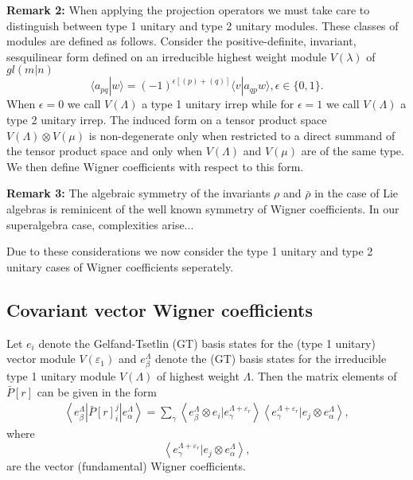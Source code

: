 \documentclass[12pt]{article}
\begin{document}
{\bf Remark 2:} 
When applying the projection operators we must take care to distinguish between type 1 unitary and type 2 unitary modules. These classes of modules are defined as follows. Consider the positive-definite, invariant, sesquilinear form defined on an irreducible highest weight module $V(\lambda)$ of $gl(m|n)$ 
$$
\langle a_{pq} | w \rangle = (-1)^{\epsilon [(p) + (q)]} \langle v | a_{qp} w \rangle , \epsilon  \in \{0,1\}.
$$
When $\epsilon = 0$ we call $V(\Lambda)$ a type 1 unitary irrep while for $\epsilon = 1$ we call $V(\Lambda)$ a type 2 unitary irrep. The induced form on a tensor product space $V(\Lambda) \otimes V(\mu)$ is non-degenerate only when restricted to a direct summand of the tensor product space and only when $ V(\Lambda)$ and $V(\mu)$ are of the same type. We then define Wigner coefficients with respect to this form. 

{\bf Remark 3:}
The algebraic symmetry of the invariants $\rho$ and $\bar{\rho}$ in the case of Lie algebras is reminicent of the well known symmetry of Wigner coefficients. In our superalgebra case, complexities arise... 

Due to these considerations we now consider the type 1 unitary and type 2 unitary cases of Wigner coefficients seperately.

\subsection{Covariant vector Wigner coefficients}

Let $e_i$ denote the Gelfand-Tsetlin (GT) basis states for the (type 1 unitary) vector module $V(\varepsilon_1)$ and ${e^\Lambda_\beta}$ denote the (GT) basis states for the irreducible type 1 unitary module $V(\Lambda)$ of highest weight $\Lambda$. Then the matrix elements of $\bar{P}[r]$ can be given in the form
\begin{align}
\left\langle e^\Lambda_\beta | \bar{P}[r]^j_i | e^{\Lambda}_\alpha \right\rangle =
\sum_\gamma \left\langle e^\Lambda_\beta \otimes e_i | e^{\Lambda + \varepsilon_r}_\gamma \right\rangle
\left\langle e^{\Lambda+\varepsilon_r}_\gamma | e_j \otimes e^\Lambda_\alpha \right\rangle, \label{BarPij}
\end{align}
where
$$
\left\langle e^{\Lambda+\varepsilon_r}_\gamma | e_j \otimes e^\Lambda_\alpha \right\rangle,
$$
are the vector (fundamental) Wigner coefficients.
\end{document}
